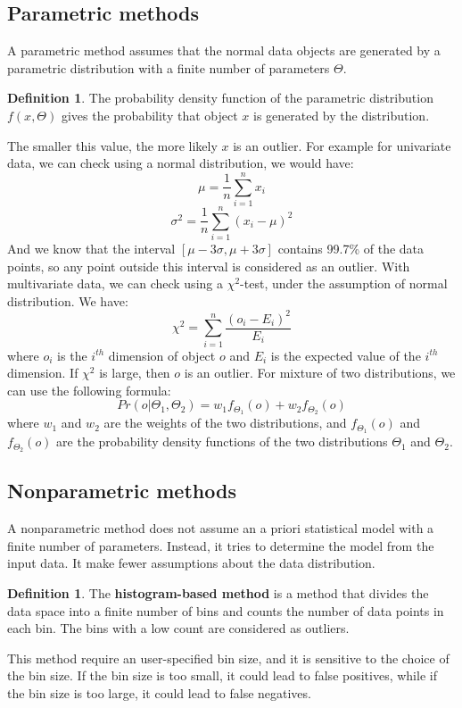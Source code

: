 \documentclass[12pt, openany]{report}
\theoremstyle{definition}
\newtheorem{definition}[thm]{Definition}
\begin{document}
\subsection{Parametric methods}
A parametric method assumes that the normal data objects are generated by a parametric distribution with a finite number of parameters $\Theta$.
\begin{definition}
    The probability density function of the parametric distribution $f (x, \Theta)$ gives the probability that object $x$ is generated by the distribution.
\end{definition}
The smaller this value, the more likely $x$ is an outlier.
For example for univariate data, we can check using a normal distribution, we would have:
\begin{equation}
    \mu = \frac{1}{n} \sum_{i=1}^{n} x_i
\end{equation}
\begin{equation}    
    \sigma^2 = \frac{1}{n} \sum_{i=1}^{n} (x_i - \mu)^2
\end{equation}
And we know that the interval $[\mu - 3\sigma, \mu + 3\sigma]$ contains 99.7\% of the data points, so any point outside this interval is considered as an outlier.
With multivariate data, we can check using a $\chi^2$-test, under the assumption of normal distribution. We have:
\begin{equation}
    \chi^2 = \sum_{i=1}^{n} \frac{(o_i - E_i)^2}{E_i}
\end{equation}
where $o_i$ is the $i^{th}$ dimension of object $o$ and $E_i$ is the expected value of the $i^{th}$ dimension. If $\chi^2$ is large, then $o$ is an outlier.
For mixture of two distributions, we can use the following formula:
\begin{equation}
    Pr(o|\Theta_1,\Theta_2) = w_1 f_{\Theta_1}(o) + w_2 f_{\Theta_2}(o)
\end{equation}
where $w_1$ and $w_2$ are the weights of the two distributions, and $f_{\Theta_1}(o)$ and $f_{\Theta_2}(o)$ are the probability density functions of the two distributions $\Theta_1$ and $\Theta_2$.
\subsection{Nonparametric methods}
A nonparametric method does not assume an a priori statistical model with a finite number of parameters. Instead, it tries to determine the model from the input data. It make fewer assumptions about the data distribution.
\begin{definition}
    The \textbf{histogram-based method} is a method that divides the data space into a finite number of bins and counts the number of data points in each bin. The bins with a low count are considered as outliers.
\end{definition}
This method require an user-specified bin size, and it is sensitive to the choice of the bin size. If the bin size is too small, it could lead to false positives, while if the bin size is too large, it could lead to false negatives.
\end{document}
